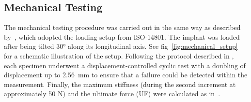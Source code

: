 \documentclass[12pt, a4paper, twoside]{report}
\begin{document}
\begin{figure}[H]
\centering 
{}
\label{fig:setup}
\end{figure}
%
\subsection{Mechanical Testing}
%
The mechanical testing procedure was carried out in the same way as described by~\citet{thierrin_primary_2022}, which adopted the loading setup from ISO-14801.
The implant was loaded after being tilted 30° along its longitudinal axis.
See fig~\ref{fig:mechanical_setup} for a schematic illustration of the setup.
Following the protocol described in \cite{voumard_intra-operative_2015}, each specimen underwent a displacement-controlled cyclic test with a doubling of displacement up to 2.56~mm to ensure that a failure could be detected within the measurement.
Finally, the maximum stiffness (during the second increment at approximately 50 N) and the ultimate force (UF) were calculated as in~\cite{wili_experimental_2021}.
\end{document}
